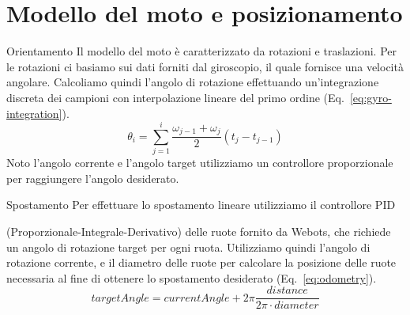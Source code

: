 \documentclass[10pt]{beamer}
\begin{document}
	\section{Modello del moto e posizionamento}\label{sec:Modello-del-moto-e-posizionamento} 
	\frame{\sectionpage}
	
	\begin{frame}{Orientamento}
		Il modello del moto è caratterizzato da rotazioni e traslazioni. Per le
		rotazioni ci basiamo sui dati forniti dal giroscopio, il quale fornisce
		una velocità angolare. Calcoliamo quindi l'angolo di rotazione
		effettuando un'integrazione discreta dei campioni con interpolazione
		lineare del primo ordine (Eq.~\ref{eq:gyro-integration}).  
		\begin{equation}\label{eq:gyro-integration}
			\theta_i = \sum_{j=1}^i \frac{\omega _{j-1}+\omega _j}{2} \left( t_j-t_{j-1} \right) 
		\end{equation}
		Noto l'angolo corrente e l'angolo target utilizziamo un controllore
		proporzionale per raggiungere l'angolo desiderato.
	\end{frame}
	
	\begin{frame}{Spostamento}
		Per effettuare lo spostamento lineare utilizziamo il controllore PID
		
		(Proporzionale-Integrale-Derivativo) delle ruote fornito da Webots, che
		richiede un angolo di rotazione target per ogni ruota. Utilizziamo quindi
		l'angolo di rotazione corrente, e il diametro delle ruote per calcolare la
		posizione delle ruote necessaria al fine di ottenere lo spostamento
		desiderato (Eq.~\ref{eq:odometry}).
		\begin{equation}\label{eq:odometry}
		targetAngle =
		currentAngle+2\pi\frac    {distance}
						{2\pi \cdot diameter}
		\end{equation}
	\end{frame}
	
\end{document}
